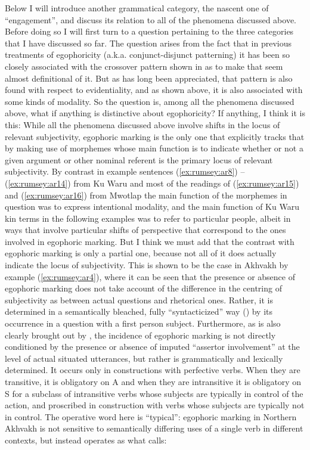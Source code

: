 \documentclass[output=paper]{langsci/langscibook}
\begin{document}
Below I will introduce another grammatical category, the nascent one of “engagement”, and discuss its relation to all of the phenomena discussed above. Before doing so I will first turn to a question pertaining to the three categories that I have discussed so far. The question arises from the fact that in previous treatments of egophoricity (a.k.a. conjunct-disjunct patterning) it has been so closely associated with the crossover pattern shown in  as to make that seem almost definitional of it. But as has long been appreciated, that pattern is also found with respect to evidentiality, and as shown above, it is also associated with some kinds of modality. So the question is, among all the phenomena discussed above, what if anything is distinctive about egophoricity?  If anything, I think it is this:  While all the phenomena discussed above involve shifts in the locus of relevant subjectivity, egophoric marking is the only one that explicitly tracks that by making use of morphemes whose main function is to indicate whether or not a given argument or other nominal referent is the primary locus of relevant subjectivity.
By contrast in example sentences (\ref{ex:rumsey:ar8}) – (\ref{ex:rumsey:ar14}) from Ku Waru and most of the readings of (\ref{ex:rumsey:ar15}) and (\ref{ex:rumsey:ar16}) from Mwotlap the main function of the morphemes in question was to express intentional modality, and the main function of Ku Waru kin terms in the following examples was to refer to particular people, albeit in ways that involve particular shifts of perspective that correspond to the ones involved in egophoric marking. But I think we must add that the contrast with egophoric marking is only a partial one, because not all of it does actually indicate the locus of subjectivity. This is shown to be the case in Akhvakh by example (\ref{ex:rumsey:ar4}), where it can be seen that the presence or absence of egophoric marking does not take account of the difference in the centring of subjectivity as between actual questions and rhetorical ones. Rather, it is determined in a semantically bleached, fully “syntacticized” way (\citealt[11]{Creissels2008}) by its occurrence in a question with a first person subject. Furthermore, as is also clearly brought out by \citeauthor{Creissels2008}, the incidence of egophoric marking is not directly conditioned by the presence or absence of imputed “assertor involvement” at the level of actual situated utterances, but rather is grammatically and lexically determined.  It occurs only in constructions with perfective verbs.  When they are transitive, it is obligatory on A and when they are intransitive it is obligatory on S for a subclass of intransitive verbs whose subjects are typically in control of the action, and proscribed in construction with verbs whose subjects are typically not in control. The operative word here is “typical”:  egophoric marking in Northern Akhvakh is not sensitive to semantically differing uses of a single verb in different contexts, but instead operates as what \citeauthor{Creissels2008} calls:
\end{document}
